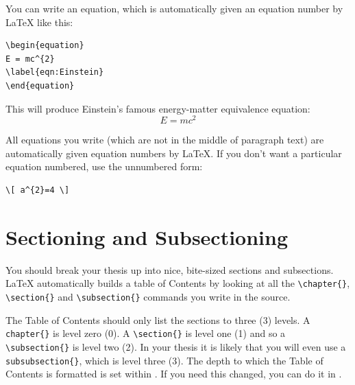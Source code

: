 You can write an equation, which is automatically given an equation number by \LaTeX{} like this:
\begin{verbatim}
\begin{equation}
E = mc^{2}
\label{eqn:Einstein}
\end{equation}
\end{verbatim}

This will produce Einstein's famous energy-matter equivalence equation:
\begin{equation}
E = mc^{2}
\label{eqn:Einstein}
\end{equation}

All equations you write (which are not in the middle of paragraph text) are automatically given equation numbers by \LaTeX{}. If you don't want a particular equation numbered, use the unnumbered form:
\begin{verbatim}
\[ a^{2}=4 \]
\end{verbatim}


\section{Sectioning and Subsectioning}

You should break your thesis up into nice, bite-sized sections and subsections. \LaTeX{} automatically builds a table of Contents by looking at all the \verb|\chapter{}|, \verb|\section{}|  and \verb|\subsection{}| commands you write in the source.

The Table of Contents should only list the sections to three (3) levels. A \verb|chapter{}| is level zero (0). A \verb|\section{}| is level one (1) and so a \verb|\subsection{}| is level two (2). In your thesis it is likely that you will even use a \verb|subsubsection{}|, which is level three (3). The depth to which the Table of Contents is formatted is set within . If you need this changed, you can do it in .

